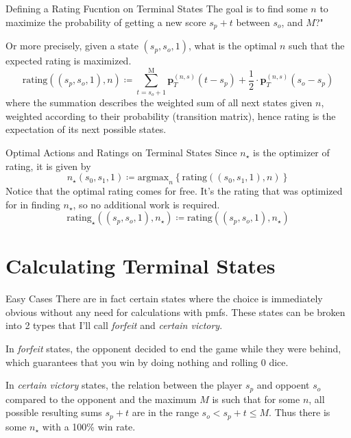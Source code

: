 \documentclass{beamer}
\begin{document}
\begin{frame}{Defining a Rating Fucntion on Terminal States}
    The goal is to find some $n$ to maximize the probability of getting a new score $s_p + t$ between $s_o$, and $M$?" 
    
    Or more precisely, given a state $(s_p, s_o, 1)$, what is the optimal $n$ such that the expected rating is maximized.  
    \begin{equation}
        \text{rating}((s_p, s_o, 1), n) \coloneqq \sum_{t = s_o+1}^{\text{M}} \textbf{p}_{T}^{(n, s)}(t - s_p) + \frac{1}{2} \cdot \textbf{p}_{T}^{(n, s)}(s_o - s_p)
    \end{equation}
    where the summation describes the weighted sum of all next states given $n$, weighted according to their probability (transition matrix), hence rating is the expectation of its next possible states. 
\end{frame}

\begin{frame}{Optimal Actions and Ratings on Terminal States}
    Since $n_{\star}$ is the optimizer of rating, it is given by
    \begin{equation}
        n_{\star}(s_0, s_1, 1) \coloneqq \text{argmax}_n \left\{ \text{rating}((s_0, s_1, 1), n) \right\}
    \end{equation}
    Notice that the optimal rating comes for free. It's the rating that was optimized for in finding $n_{\star}$, so no additional work is required.
    \begin{equation}
        \text{rating}_{\star}((s_p, s_o, 1), n_{\star}) \coloneqq \text{rating}((s_p, s_o, 1), n_{\star})
    \end{equation}
\end{frame}

\section{Calculating Terminal States}


\begin{frame}{Easy Cases}
    There are in fact certain states where the choice is immediately obvious without any need for calculations with pmfs. These states can be broken into 2 types that I'll call \textit{forfeit} and \textit{certain victory}. 

    In \textit{forfeit} states, the opponent decided to end the game while they were behind, which guarantees that you win by doing nothing and rolling 0 dice.  

    In \textit{certain victory} states, the relation between the player $s_p$ and oppoent $s_o$ compared to the opponent and the maximum $M$ is such that for some $n$, all possible resulting sums $s_p + t$ are in the range $s_o < s_p + t  \leq M$. Thus there is some $n_{\star}$ with a 100\% win rate.
\end{frame}
\end{document}
